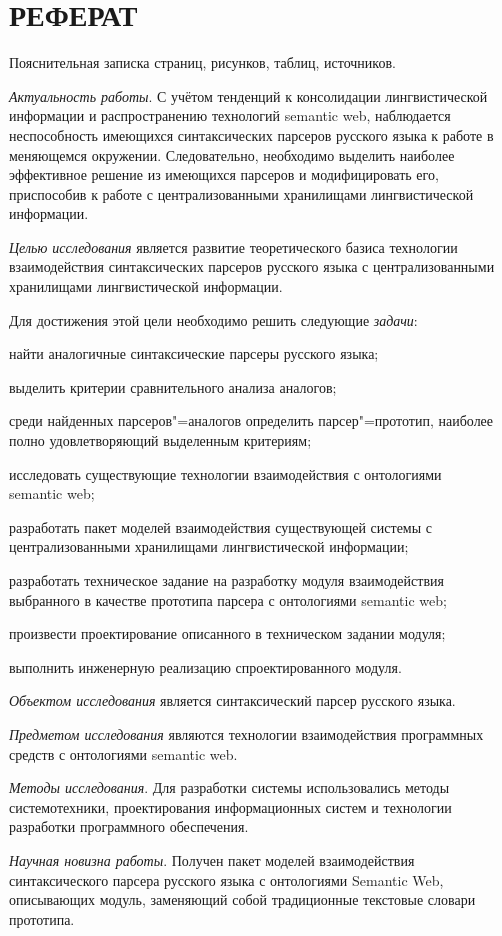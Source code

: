 \section*{\centering РЕФЕРАТ}

Пояснительная записка  страниц,  рисунков, 
таблиц,  источников.

\emph{Актуальность работы}. С учётом тенденций к консолидации лингвистической 
информации и распространению технологий semantic web, наблюдается неспособность
имеющихся синтаксических парсеров русского языка к работе в меняющемся окружении. 
Следовательно, необходимо выделить наиболее эффективное решение из имеющихся
парсеров и модифицировать его, приспособив к работе с централизованными
хранилищами лингвистической информации.

\emph{Целью исследования} является развитие теоретического базиса технологии
взаимодействия синтаксических парсеров русского языка с централизованными
хранилищами лингвистической информации.

Для достижения этой цели необходимо решить следующие \emph{задачи}:
\begin{list}{}{\leftmargin=1.5cm} \itemsep0pt
  \item найти аналогичные синтаксические парсеры русского языка;
  \item выделить критерии сравнительного анализа аналогов;
  \item среди найденных парсеров"=аналогов определить парсер"=прототип,
  наиболее полно удовлетворяющий выделенным критериям;
  \item исследовать существующие технологии взаимодействия с онтологиями \\
  semantic  web;
  \item разработать пакет моделей взаимодействия существующей системы с
  централизованными хранилищами лингвистической информации;
  \item разработать техническое задание на разработку модуля взаимодействия выбранного
  в качестве прототипа парсера с онтологиями semantic web;
  \item произвести проектирование описанного в техническом задании модуля;
  \item выполнить инженерную реализацию спроектированного модуля.
\end{list}

\emph{Объектом исследования} является синтаксический парсер русского языка.

\emph{Предметом исследования} являются технологии взаимодействия программных
средств с онтологиями semantic web.

\emph{Методы исследования}. Для разработки системы использовались методы
системотехники, проектирования информационных систем и технологии разработки
программного обеспечения.

\emph{Научная новизна работы}. Получен пакет моделей взаимодействия синтаксического
парсера русского языка с онтологиями Semantic Web, описывающих модуль, заменяющий собой традиционные текстовые словари прототипа.
